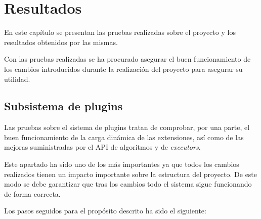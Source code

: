 \chapter{Resultados}

En este capítulo se presentan las pruebas realizadas sobre el proyecto y los resultados obtenidos por las mismas.

Con las pruebas realizadas se ha procurado asegurar el buen funcionamiento de los cambios introducidos durante la realización del proyecto para asegurar su utilidad.

\section{Subsistema de plugins}

Las pruebas sobre el sistema de plugins tratan de comprobar, por una parte, el buen funcionamiento de la carga dinámica de las extensiones, así como de las mejoras suministradas por el API de algoritmos y de \emph{executors}.

Este apartado ha sido uno de los más importantes ya que todos los cambios realizados tienen un impacto importante sobre la estructura del proyecto. De este modo se debe garantizar que tras los cambios todo el sistema sigue funcionando de forma correcta.

Los pasos seguidos para el propósito descrito ha sido el siguiente:


